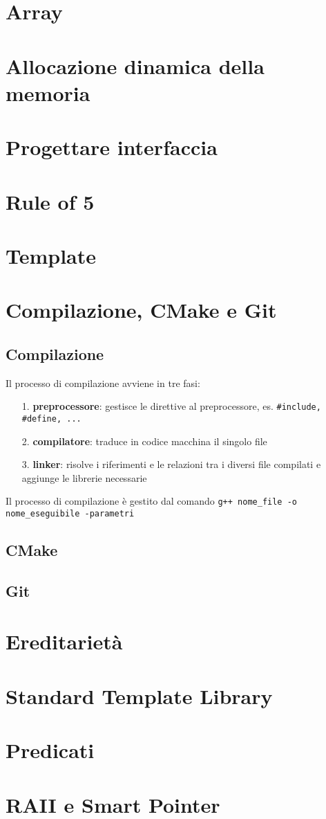 \documentclass[a4paper]{article}
\begin{document}
\section{Array}
\section{Allocazione dinamica della memoria}
\section{Progettare interfaccia}
\section{Rule of 5}
\section{Template}

\section{Compilazione, CMake e Git}
\subsection{Compilazione}
Il processo di compilazione avviene in tre fasi:
\begin{itemize}
	\item[1.] \textbf{preprocessore}: gestisce le direttive al preprocessore, es. \verb|#include, #define, ...|
	\item[2.] \textbf{compilatore}: traduce in codice macchina il singolo file
	\item[3.] \textbf{linker}: risolve i riferimenti e le relazioni tra i diversi file compilati e aggiunge le librerie necessarie
\end{itemize}
Il processo di compilazione è gestito dal comando \verb|g++ nome_file -o nome_eseguibile -parametri|

\subsection{CMake}
\subsection{Git}

\section{Ereditarietà}
\section{Standard Template Library}
\section{Predicati}
\section{RAII e Smart Pointer}
\end{document}
